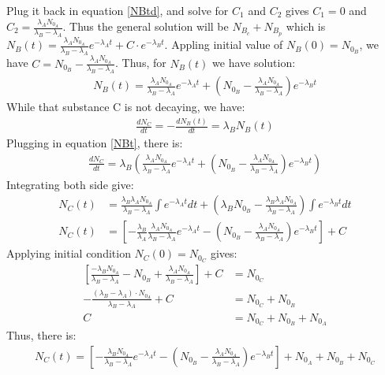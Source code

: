 \documentclass{article}
\begin{document}
Plug it back in equation \ref{NBtd}, and solve for \(C_1\) and \(C_2\) gives \(C_1 = 0\) and \(C_2 = \displaystyle \frac{\lambda_A N_{0_A}}{\lambda_B-\lambda_A}\).
Thus the general solution will be \(N_{B_c}+N_{B_p}\) which is \(N_B(t)=\frac{\lambda_A N_{0_A}}{\lambda_B-\lambda_A}e^{-\lambda_At}+C\cdot e^{-\lambda_Bt}\). 
Appling initial value of \(N_B(0)=N_{0_B}\), we have \(C=N_{0_B}-\frac{\lambda_A N_{0_A}}{\lambda_B-\lambda_A}\). Thus, for \(N_B(t)\) we have solution:
\begin{align}
    N_B(t)=\frac{\lambda_A N_{0_A}}{\lambda_B-\lambda_A}e^{-\lambda_At}+\left(N_{0_B}-\frac{\lambda_A N_{0_A}}{\lambda_B-\lambda_A}\right)e^{-\lambda_Bt} \label{NBt}
\end{align}
While that substance C is not decaying, we have:
\begin{align}
    \frac{dN_C}{dt}=-\frac{dN_B(t)}{dt}=\lambda_BN_B(t) \label{NCtd}
\end{align}
Plugging in equation \ref{NBt}, there is:
\begin{align*}
    \frac{dN_C}{dt} = \lambda_B\left(\frac{\lambda_A N_{0_A}}{\lambda_B-\lambda_A}e^{-\lambda_At}+\left(N_{0_B}-\frac{\lambda_A N_{0_A}}{\lambda_B-\lambda_A}\right)e^{-\lambda_Bt}\right)
\end{align*}
Integrating both side give:
\begin{align*}
    N_C(t)&=\frac{\lambda_B\lambda_A N_{0_A}}{\lambda_B-\lambda_A} \int e^{-\lambda_A t}dt +(\lambda_BN_{0_B}-\frac{\lambda_B\lambda_A N_{0_A}}{\lambda_B-\lambda_A})\int e^{-\lambda_Bt}dt\\
    N_C(t)&=\left[-\frac{\lambda_B}{\lambda_A}\frac{\lambda_A N_{0_A}}{\lambda_B-\lambda_A}e^{-\lambda_At}-\left(N_{0_B}-\frac{\lambda_A N_{0_A}}{\lambda_B-\lambda_A}\right)e^{-\lambda_Bt}\right]+C
\end{align*}
Applying initial condition \(N_C(0)=N_{0_C}\) gives:
\begin{align*}
    \left[\frac{-\lambda_B N_{0_A}}{\lambda_B-\lambda_A}-N_{0_B}+\frac{\lambda_A N_{0_A}}{\lambda_B-\lambda_A}\right]+C&=N_{0_C}\\
    -\frac{(\lambda_B-\lambda_A)\cdot N_{0_A}}{\lambda_B-\lambda_A} +C&= N_{0_C}+N_{0_B}\\
    C&=N_{0_C}+N_{0_B}+N_{0_A}
\end{align*}
Thus, there is:
\begin{align}
    N_C(t)=\left[-\frac{\lambda_B N_{0_A}}{\lambda_B-\lambda_A}e^{-\lambda_At}-\left(N_{0_B}-\frac{\lambda_A N_{0_A}}{\lambda_B-\lambda_A}\right)e^{-\lambda_Bt}\right]+N_{0_A}+N_{0_B}+N_{0_C} \label{NCt}
\end{align}
\end{document}
